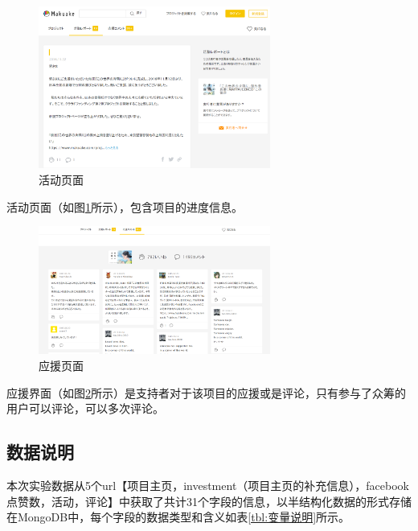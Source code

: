 \documentclass[lang=cn,a4paper]{elegantpaper}
\begin{document}
\begin{figure}[!htbp]
  \centering
  \includegraphics[width=3in]{image/makuake project2.png}
  \caption{活动页面}
  \label{fig:project2}
\end{figure}

活动页面（如图\ref{fig:project2}所示），包含项目的进度信息。

\begin{figure}[!htbp]
  \centering
  \includegraphics[width=3in]{image/makuake project3.png}
  \caption{应援页面}
  \label{fig:project3}
\end{figure}

应援界面（如图\ref{fig:project3}所示）是支持者对于该项目的应援或是评论，只有参与了众筹的用户可以评论，可以多次评论。

\subsection{数据说明}
本次实验数据从5个url【项目主页，investment（项目主页的补充信息），facebook点赞数，活动，评论】中获取了共计31个字段的信息，以半结构化数据的形式存储在MongoDB中，每个字段的数据类型和含义如表\ref{tbl:变量说明}所示。
\end{document}
